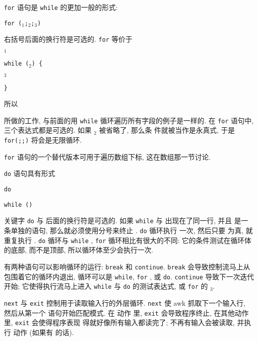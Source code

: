 \verb'for' 语句是 \verb'while' 的更加一般的形式:
\begin{pattern}
    \verb'for ('\expr$_1$\verb';'\expr$_2$\verb';'\expr$_3$\verb')' \par
    \indent\indent\stmt
\end{pattern}
右括号后面的换行符是可选的. \verb'for' 等价于
\begin{pattern}
    \expr$_1$ \par
    \verb'while ('\expr$_2$\verb') {' \par
        \indent\indent\stmt  \par
        \indent\indent\expr$_3$ \par
    \verb'}'
\end{pattern}
所以
所做的工作, 与前面的用 \verb'while' 循环遍历所有字段的例子是一样的. 在
\verb'for' 语句中, 三个表达式都是可选的. 如果 \expr$_2$ 被省略了, 那么条
件就被当作是永真式, 于是 \verb'for(;;)' 将会是无限循环.

\verb'for' 语句的一个替代版本可用于遍历数组下标, 这在数组那一节讨论.

\verb'do' 语句具有形式
\begin{pattern}
    \verb'do' \par
    \indent\indent\stmt\par
    \verb'while ('\expr\verb')'
\end{pattern}
关键字 \verb'do' 与 \stmt 后面的换行符是可选的. 如果 \verb'while' 与 \stmt
出现在了同一行, 并且 \stmt 是一条单独的语句, 那么就必须使用分号来终止
\stmt. \verb'do' 循环执行 \stmt 一次, 然后只要 \expr 为真, 就重复执行
\stmt. \verb'do' 循环与 \verb'while' , \verb'for' 循环相比有很大的不同:
它的条件测试在循环体的底部, 而不是顶部, 所以循环体至少会执行一次.

有两种语句可以影响循环的运行: \verb'break' 和 \verb'continue'. \verb'break'
会导致控制流马上从包围着它的循环内退出, 循环可以是 \verb'while', \verb'for'
, 或 \verb'do'. \verb'continue' 导致下一次迭代开始; 它使得执行流马上进入
\verb'while' 与 \verb'do' 的测试表达式, 或 \verb'for' 的 \expr$_3$.

\verb'next' 与 \verb'exit' 控制用于读取输入行的外层循环. \verb'next' 使
awk 抓取下一个输入行, 然后从第一个 \patact 语句开始匹配模式. 在 \END 动作
里, \verb'exit' 会导致程序终止, 在其他动作里, \verb'exit' 会使得程序表现
得就好像所有输入都读完了; 不再有输入会被读取, 并执行 \END 动作 (如果有 \END
的话).

